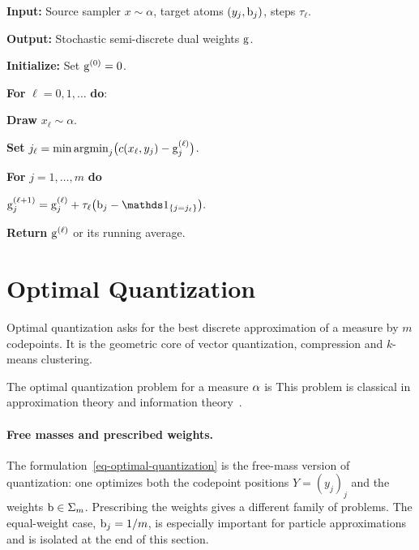 \begin{alg}\label{alg:semidiscrete-stochastic-ascent}
\textbf{Input:} Source sampler $x\sim\alpha$, target atoms $(y_j,\mathrm{b}_j)$, steps $\tau_\ell$.

\textbf{Output:} Stochastic semi-discrete dual weights $\mathrm{g}$.

\textbf{Initialize:} Set $\mathrm{g}^{(0)}=0$.

\textbf{For} $\ell=0,1,\ldots$ \textbf{do}:
\begin{algblock}

\textbf{Draw} $x_\ell\sim\alpha$.

\textbf{Set} \(j_\ell=\min\operatorname{argmin}_j\bigl(c(x_\ell,y_j)-\mathrm{g}_j^{(\ell)}\bigr)\).

\textbf{For} $j=1,\ldots,m$ \textbf{do}
\begin{algblock}
\(\gD_j^{(\ell+1)} = \gD_j^{(\ell)} + \tau_\ell\bigl(\b_j-\ones_{\{j=j_\ell\}}\bigr).\)
\end{algblock}
\end{algblock}
\algreturnskip
\textbf{Return} $\mathrm{g}^{(\ell)}$ or its running average.
\end{alg}


\section{Optimal Quantization}
\label{sec-optimal-quantization}

Optimal quantization asks for the best discrete approximation of a measure by $m$ codepoints. It is the geometric core of vector quantization, compression and $k$-means clustering.

The optimal quantization problem for a measure $\alpha$ is
This problem is classical in approximation theory and information theory~\cite{graf2000foundationsquantization,Lloyd82}.

\paragraph{Free masses and prescribed weights.}
The formulation~\eqref{eq-optimal-quantization} is the free-mass version of quantization: one optimizes both the codepoint positions $Y=(y_j)_j$ and the weights $\mathrm{b}\in\Sigma_m$. Prescribing the weights gives a different family of problems. The equal-weight case, $\mathrm{b}_j=1/m$, is especially important for particle approximations and is isolated at the end of this section.

